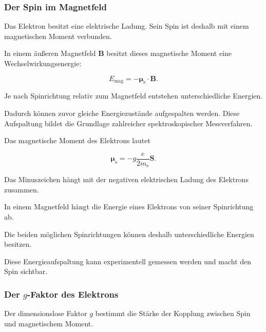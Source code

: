 \subsubsection*{Der Spin im Magnetfeld}

Das Elektron besitzt eine elektrische Ladung. Sein Spin ist deshalb mit
einem magnetischen Moment%
 verbunden.

In einem äußeren Magnetfeld \(\mathbf{B}\) besitzt dieses magnetische
Moment eine Wechselwirkungsenergie:

\begin{equation}
	E_{\mathrm{mag}}
	=
	-
	\boldsymbol{\mu}_{\mathrm s}
	\cdot
	\mathbf{B}.
	\label{eq:spin_wechselwirkungsenergie_magnetfeld}
\end{equation}

Je nach Spinrichtung relativ zum Magnetfeld entstehen unterschiedliche
Energien.

Dadurch können zuvor gleiche Energiezustände aufgespalten werden. Diese
Aufspaltung bildet die Grundlage zahlreicher spektroskopischer
Messverfahren.

Das magnetische Moment des Elektrons lautet

\begin{equation}
	\boldsymbol{\mu}_{\mathrm s}
	=
	-g
	\frac{e}{2m_{\mathrm e}}
	\mathbf{S}.
	\label{eq:magnetisches_moment_spin_dirac}
\end{equation}

Das Minuszeichen hängt mit der negativen elektrischen Ladung des
Elektrons zusammen.

\begin{DidacticBox}
	\label{box:spin_im_magnetfeld}
	
	In einem Magnetfeld hängt die Energie eines Elektrons von seiner
	Spinrichtung ab.
	
	Die beiden möglichen Spinrichtungen können deshalb unterschiedliche
	Energien besitzen.
	
	Diese Energieaufspaltung kann experimentell gemessen werden und macht
	den Spin sichtbar.
\end{DidacticBox}

\subsubsection*{Der \(g\)-Faktor des Elektrons}

Der dimensionslose Faktor \(g\) bestimmt die Stärke der Kopplung
zwischen Spin und magnetischem Moment.


